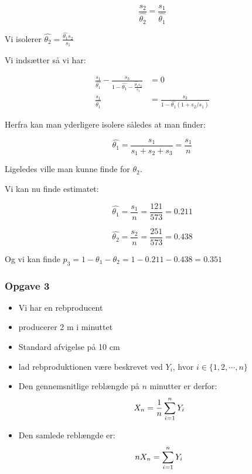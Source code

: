 \begin{equation}
    \frac{s_2}{ \hat{\theta_2}} = \frac{s_1}{\hat{\theta_1}}
\end{equation}



Vi isolerer $\hat{\theta_2} = \frac{\hat{\theta_1} s_2}{s_1}$

Vi indsætter så vi har:


\begin{align}
    \frac{s_1}{\hat{\theta_1}} - \frac{s_3}{1-\hat{\theta_1} - \frac{\hat{\theta_1} s_2}{s_1}} &= 0 \\
    \frac{s_1}{\hat{\theta_1}} &= \frac{s_3}{1-\hat{\theta_1}(1 + s_2/s_1)}
\end{align}

Herfra kan man yderligere isolere således at man finder:

\begin{equation}
    \hat{\theta_1} = \frac{s_1}{s_1 + s_2 + s_3} = \frac{s_1}{n}
\end{equation}

Ligeledes ville man kunne finde for $\theta_2$.

Vi kan nu finde estimatet:

\begin{equation}
    \hat{\theta_1} = \frac{s_1}{n} = \frac{121}{573} = 0.211
\end{equation}

\begin{equation}
    \hat{\theta_2} = \frac{s_2}{n} = \frac{251}{573} = 0.438
\end{equation}

Og vi kan finde $p_3 = 1 - \theta_1 -\theta_2 =1 - 0.211 - 0.438  =0.351$

\subsubsection{Opgave 3}

\begin{itemize}
    \item Vi har en rebproducent
    \item producerer 2 m i minuttet
    \item Standard afvigelse på 10 cm
    \item lad rebproduktionen være beskrevet ved $Y_i$, hvor $i \in \{1, 2, \cdots, n\}$
    \item Den gennemsnitlige reblængde på $n$ minutter er derfor:
    \begin{equation}
        X_n = \frac{1}{n}\sum_{i=1}^{n} Y_i
    \end{equation}
    \item Den samlede reblængde er:
    \begin{equation}
        n X_n =  \sum_{i=1}^{n} Y_i
    \end{equation}
\end{itemize}

